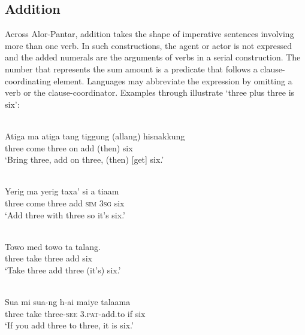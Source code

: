 \subsection{Addition}
\label{sec:8:Addition}
Across Alor-Pantar, addition takes the shape of imperative sentences involving more than one verb. In such constructions, the agent or actor is not expressed and the added numerals are the arguments of verbs in a serial construction. The number that represents the sum amount is a predicate that follows a clause-coordinating element. Languages may abbreviate the expression by omitting a verb or the clause-coordinator. Examples  through  illustrate `three plus three is six':


\ea%
\label{bkm:Ref342663714}
\\
 
\gll Atiga  ma{\footnotemark}  atiga  tang  tiggung  (allang)  hisnakkung\\  
   three   come  three  on  add  (then)  six \\
\glt  `Bring three, add on three, (then) [get] six.'
\z
{}


\ea
\label{ex:8:1237}
 
\\
 \gll Yerig  ma  yerig  taxa'   si  a  tiaam\\
   three  come  three  add  \textsc{sim  3sg } six \\
 \glt`Add three with three so it's six.'
\z


 

  


\ea
\label{ex:8:1238}
\\ 
 \gll Towo  med  towo  ta  talang.\\
    three   take   three   add   six\\
 \glt `Take three add three (it's) six.'
\z

\ea
\label{ex:8:1239}
\\
 \gll Sua  mi  sua-ng  h-ai  maiye  talaama\\
  three  take  three-\textsc{see}  \textsc{3.pat}{}-add.to  if  six \\
 \glt  `If you add three to three, it is six.'  
\z




